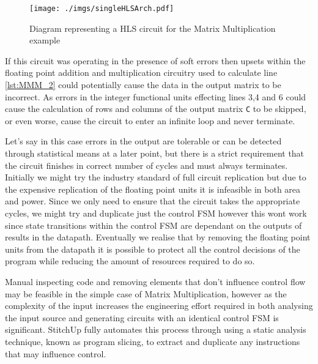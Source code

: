 \begin{figure}[!t]
\centering
\texttt{[image: ./imgs/singleHLSArch.pdf]}
\caption{Diagram representing a HLS circuit for the Matrix Multiplication example}
\label{fig:singleHLSArch}
\vspace{-9mm}
\end{figure}

If this circuit was operating in the presence of soft errors then upsets within
the floating point addition and multiplication circuitry used to calculate line \ref{lst:MMM_2} could potentially cause the data in the output
matrix to be incorrect.
As errors in the integer functional units effecting lines 3,4 and 6
could cause the calculation of rows and columns of the output matrix \lstinline$C$ to be skipped, or even
worse, cause the circuit to enter an infinite loop and never terminate.

Let's say in this case errors in
the output are tolerable or can be detected through statistical means at a later point, but
there is a strict requirement that the circuit finishes in correct number of cycles and must
always terminates.
Initially we might try the industry standard of full circuit replication
but due to the expensive replication of the floating point units it is infeasible in both area and power.
Since we only need to ensure that the circuit takes the appropriate cycles,
we might try and duplicate just the control FSM however this wont work since state transitions
within the control FSM are dependant on the outputs of results in the datapath.
Eventually we realise that by removing the floating point units from the datapath
it is  possible to protect all the control decisions of the program while reducing the amount of resources required
to do so.

Manual inspecting code and removing elements that don't influence control flow
may be feasible in the simple case of Matrix Multiplication, however as the complexity of the input increases
the engineering effort required in both analysing the input source and generating circuits with an identical control FSM is
significant.
StitchUp fully automates this process through using a static analysis technique, known as program slicing, to extract
and duplicate any instructions that may influence control.

